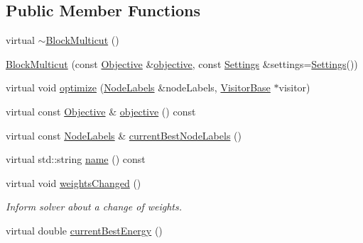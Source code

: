 \subsection*{Public Member Functions}
\begin{DoxyCompactItemize}
\item 
virtual \hyperlink{classnifty_1_1graph_1_1BlockMulticut_aa93ec015453a1db38b4584536c1f08e9}{$\sim$\+Block\+Multicut} ()
\item 
\hyperlink{classnifty_1_1graph_1_1BlockMulticut_aff4bdd169d64ae91a10559dc6d8b4816}{Block\+Multicut} (const \hyperlink{classnifty_1_1graph_1_1BlockMulticut_a5a0258cebb392718a4565551cd43ab89}{Objective} \&\hyperlink{classnifty_1_1graph_1_1BlockMulticut_ae47bcd7baf68c06f14349238001e6da6}{objective}, const \hyperlink{structnifty_1_1graph_1_1BlockMulticut_1_1Settings}{Settings} \&settings=\hyperlink{structnifty_1_1graph_1_1BlockMulticut_1_1Settings}{Settings}())
\item 
virtual void \hyperlink{classnifty_1_1graph_1_1BlockMulticut_a160c2bc3b8b70e886c7234d3a7f013f6}{optimize} (\hyperlink{classnifty_1_1graph_1_1BlockMulticut_a5ee7c08b785b538685e3e30a93586d39}{Node\+Labels} \&node\+Labels, \hyperlink{classnifty_1_1graph_1_1BlockMulticut_a7338bedc1f9032f950cfc3a2ca446a17}{Visitor\+Base} $\ast$visitor)
\item 
virtual const \hyperlink{classnifty_1_1graph_1_1BlockMulticut_a5a0258cebb392718a4565551cd43ab89}{Objective} \& \hyperlink{classnifty_1_1graph_1_1BlockMulticut_ae47bcd7baf68c06f14349238001e6da6}{objective} () const 
\item 
virtual const \hyperlink{classnifty_1_1graph_1_1BlockMulticut_a5ee7c08b785b538685e3e30a93586d39}{Node\+Labels} \& \hyperlink{classnifty_1_1graph_1_1BlockMulticut_a725bb3c39577cf5db096c27be733f971}{current\+Best\+Node\+Labels} ()
\item 
virtual std\+::string \hyperlink{classnifty_1_1graph_1_1BlockMulticut_ae8d808c313c70ce15e77f4638e245bd6}{name} () const 
\item 
virtual void \hyperlink{classnifty_1_1graph_1_1BlockMulticut_a808b91b14299d5c0c6581216f8a1c865}{weights\+Changed} ()
\begin{DoxyCompactList}\small\item\em Inform solver about a change of weights. \end{DoxyCompactList}\item 
virtual double \hyperlink{classnifty_1_1graph_1_1BlockMulticut_a19c52eccee54d6489f2684ce2706b1e5}{current\+Best\+Energy} ()
\end{DoxyCompactItemize}


